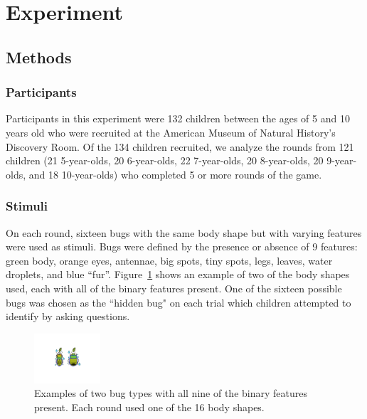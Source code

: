 \documentclass[10pt,letterpaper]{article}
\begin{document}
\section{Experiment}


\subsection{Methods}

\subsubsection{Participants}

Participants in this experiment were 132 children between the ages of 5 and 10 
years old who were recruited at the American Museum of Natural History's 
Discovery Room. Of the 134 children recruited, we analyze the rounds from 121 
children (21 5-year-olds, 20 6-year-olds, 22 7-year-olds, 20 8-year-olds, 20 9-year-olds, 
and 18 10-year-olds) who completed 5 or more rounds of the game.

\subsubsection{Stimuli}

On each round, sixteen bugs with the same body shape but with varying features were used as stimuli. Bugs were defined by the presence or absence of 9 features: green body, 
orange eyes, antennae, big spots, tiny spots, legs, leaves, water droplets, and blue 
``fur''. Figure~\ref{fig:example_bugs} shows an example of two of the body shapes used, each with all of the binary features present. One of the sixteen possible bugs was chosen as the ``hidden bug" on each trial which 
children attempted to identify by asking questions.


\begin{figure}[h]
  \centering
  \includegraphics[width=0.22\textwidth]{figures/example_bugs}
  \caption{Examples of two bug types with all nine of the binary features present. Each round used one of the 16 
body shapes. } %
  \label{fig:example_bugs}
\end{figure} 
\end{document}
